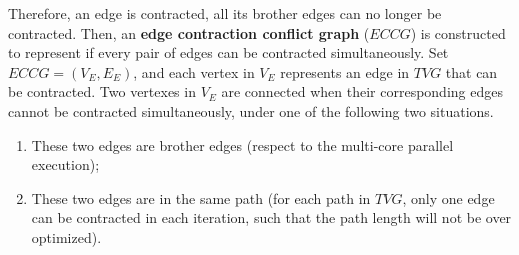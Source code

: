 \documentclass[10pt,journal]{IEEEtran}
\begin{document}
Therefore, an edge is contracted, all its brother edges can no longer be contracted. Then, an \textbf{edge contraction conflict graph} ($ECCG$) is constructed to represent if every pair of edges can be contracted simultaneously. Set $ECCG=(V_E,E_E)$, and each vertex in $V_E$ represents an edge in $TVG$ that can be contracted. Two vertexes in $V_E$ are connected when their corresponding edges cannot be contracted simultaneously, under one of the following two situations.

\begin{enumerate}
\item These two edges are brother edges (respect to the multi-core parallel execution);
\item These two edges are in the same path (for each path in $TVG$, only one edge can be contracted in each iteration, such that the path length will not be over optimized).
\end{enumerate}
\end{document}
